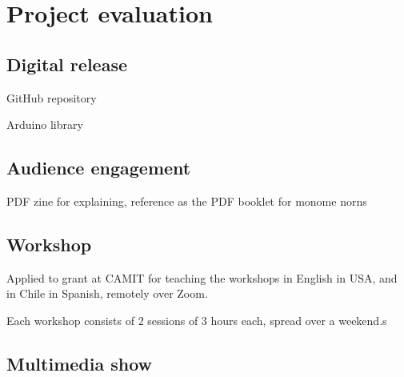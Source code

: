 \chapter{Project evaluation}

\section{Digital release}

GitHub repository

Arduino library

\section{Audience engagement}

PDF zine for explaining, reference as the PDF booklet for monome norns

\section{Workshop}


Applied to grant at CAMIT for teaching the workshops in English in USA, and in Chile in Spanish, remotely over Zoom.

Each workshop consists of 2 sessions of 3 hours each, spread over a weekend.s

\section{Multimedia show}

